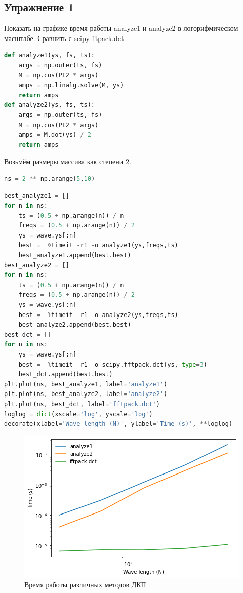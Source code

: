 \subsection{Упражнение 1}

Показать на графике время работы analyze1 и analyze2 в логорифмическом масштабе. Сравнить с scipy.fftpack.dct.

\begin{lstlisting}[language=Python]
def analyze1(ys, fs, ts):
    args = np.outer(ts, fs)
    M = np.cos(PI2 * args)
    amps = np.linalg.solve(M, ys)
    return amps
def analyze2(ys, fs, ts):
    args = np.outer(ts, fs)
    M = np.cos(PI2 * args)
    amps = M.dot(ys) / 2
    return amps
\end{lstlisting}

Возьмём размеры массива как степени 2.

\begin{lstlisting}[language=Python]
ns = 2 ** np.arange(5,10)
\end{lstlisting}

\begin{lstlisting}[language=Python]
best_analyze1 = []
for n in ns:
    ts = (0.5 + np.arange(n)) / n
    freqs = (0.5 + np.arange(n)) / 2
    ys = wave.ys[:n]
    best =  %timeit -r1 -o analyze1(ys,freqs,ts)
    best_analyze1.append(best.best)
best_analyze2 = []
for n in ns:
    ts = (0.5 + np.arange(n)) / n
    freqs = (0.5 + np.arange(n)) / 2
    ys = wave.ys[:n]
    best =  %timeit -r1 -o analyze2(ys,freqs,ts)
    best_analyze2.append(best.best)
best_dct = []
for n in ns:
    ys = wave.ys[:n]
    best =  %timeit -r1 -o scipy.fftpack.dct(ys, type=3)
    best_dct.append(best.best)
plt.plot(ns, best_analyze1, label='analyze1')
plt.plot(ns, best_analyze2, label='analyze2')
plt.plot(ns, best_dct, label='fftpack.dct')
loglog = dict(xscale='log', yscale='log')
decorate(xlabel='Wave length (N)', ylabel='Time (s)', **loglog)
\end{lstlisting}

\begin{figure}[H]
	\begin{center}
		\includegraphics[scale=1]{fig/lab06/lab06_18_0.png}
		\caption{Время работы различных методов ДКП}
	\end{center}
\end{figure}

